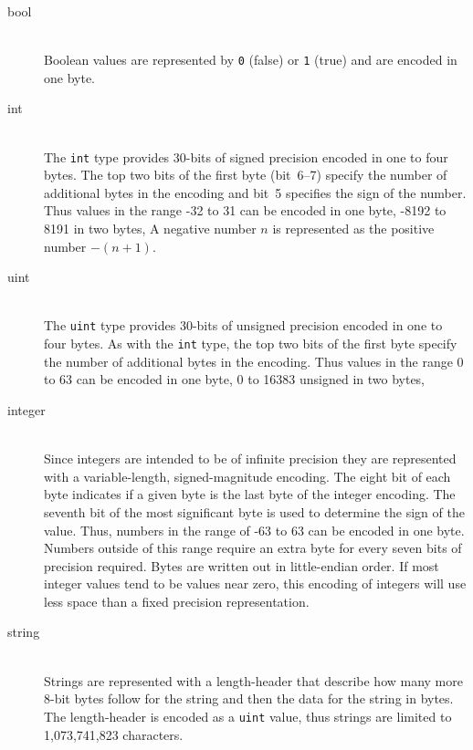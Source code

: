 \begin{description}
  \item[bool] \mbox{}\\
    Boolean values are represented by \lstinline!0! (false) or \lstinline!1! (true)
    and are encoded in one byte.

 \item[int] \mbox{}\\
    The \lstinline!int! type provides 30-bits of signed precision encoded in one to
    four bytes.
    The top two bits of the first byte (bit~6--7) specify the number of additional
    bytes in the encoding and bit~5 specifies the sign of the number.
    Thus values in the range -32 to 31 can be encoded in one byte,
    -8192 to 8191 in two bytes, \etc{}
    A negative number $n$ is represented as the positive number $-(n+1)$.

  \item[uint] \mbox{}\\
    The \lstinline!uint! type provides 30-bits of unsigned precision encoded in one
    to four bytes.
    As with the \lstinline!int! type, the top two bits of the first byte specify the
    number of additional bytes in the encoding.
    Thus values in the range 0 to 63 can be encoded in one byte,
    0 to 16383 unsigned in two bytes, \etc{}

  \item[integer] \mbox{}\\
    Since \asdl{} integers are intended to be of infinite precision they are
    represented with a variable-length, signed-magnitude encoding.
    The eight bit of each byte indicates if a given byte is the last byte of
    the integer encoding.
    The seventh bit of the most significant byte is used to determine the
    sign of the value.
    Thus, numbers in the range of -63 to 63 can be encoded in one byte.
    Numbers outside of this range require an extra byte for every seven bits
    of precision required.
    Bytes are written out in little-endian order.
    If most integer values tend to be values near zero, this encoding of integers
    will use less space than a fixed precision representation.

  \item[string] \mbox{}\\
    Strings are represented with a length-header that describe how many more
    8-bit bytes follow for the string and then the data for the string in bytes.
    The length-header is encoded as a \lstinline!uint! value, thus strings are limited
    to 1,073,741,823 characters.


\end{description}
